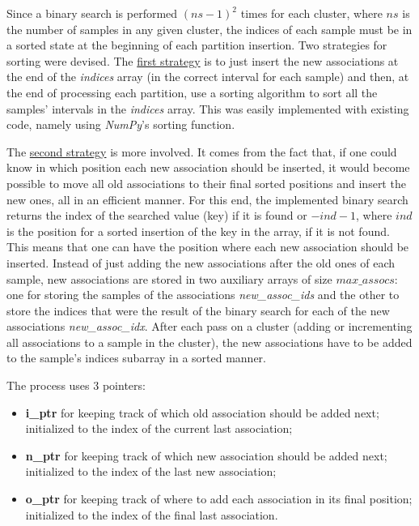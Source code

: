 Since a binary search is performed $(ns - 1)^2$ times for each cluster, where $ns$ is the number of samples in any given cluster, the indices of each sample must be in a sorted state at the beginning of each partition insertion.
Two strategies for sorting were devised.
The \underline{first strategy} is to just insert the new associations at the end of the \emph{indices} array (in the correct interval for each sample) and then, at the end of processing each partition, use a sorting algorithm to sort all the samples' intervals in the \emph{indices} array.
This was easily implemented with existing code, namely using \emph{NumPy}'s sorting function.

The \underline{second strategy} is more involved.
It comes from the fact that, if one could know in which position each new association should be inserted, it would become possible to move all old associations to their final sorted positions and insert the new ones, all in an efficient manner.
For this end, the implemented binary search returns the index of the searched value (key) if it is found or $-ind -1$, where $ind$ is the position for a sorted insertion of the key in the array, if it is not found.
This means that one can have the position where each new association should be inserted.
Instead of just adding the new associations after the old ones of each sample, new associations are stored in two auxiliary arrays of size $max\_assocs$: one for storing the samples of the associations \emph{new\_assoc\_ids} and the other to store the indices that were the result of the binary search for each of the new associations \emph{new\_assoc\_idx}.
After each pass on a cluster (adding or incrementing all associations to a sample in the cluster), the new associations have to be added to the sample's indices subarray in a sorted manner.



The process uses 3 pointers:
\begin{itemize}
\item \textbf{i\_ptr} for keeping track of which old association should be added next; initialized to the index of the current last association;
\item \textbf{n\_ptr} for keeping track of which new association should be added next; initialized to the index of the last new association;
\item \textbf{o\_ptr} for keeping track of where to add each association in its final position; initialized to the index of the final last association.
\end{itemize}


